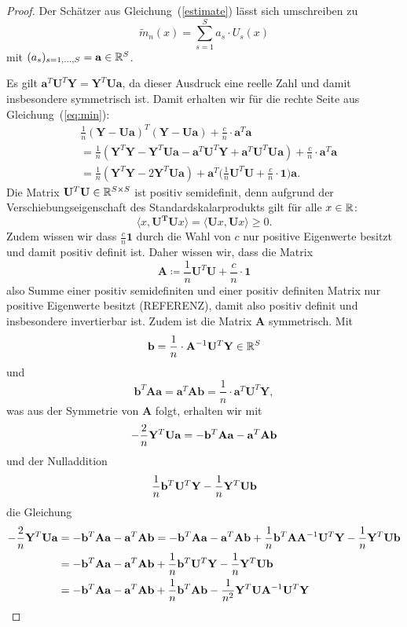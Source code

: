 \begin{proof}
Der Schätzer aus Gleichung~(\ref{estimate}) lässt sich umschreiben zu 
\begin{equation}
\label{umschreiben}
\tilde{m}_n(x) = \sum_{s = 1}^S a_s \cdot U_s(x)
\end{equation}
mit $(a_s)_{s = 1,\dots,S} = \mathbf{a}\in \mathbb{R}^S$. 

Es gilt $\mathbf{a}^T\mathbf{U}^T\mathbf{Y} = \mathbf{Y}^T\mathbf{U}\mathbf{a}$, da dieser Ausdruck eine reelle Zahl und damit insbesondere symmetrisch ist. Damit erhalten wir für die rechte Seite aus Gleichung~(\ref{eq:min}):
\begin{equation}
\label{eq:matrix}
\begin{split}
& \frac{1}{n}(\mathbf{Y} - \mathbf{U}\mathbf{a})^T(\mathbf{Y} - \mathbf{U}\mathbf{a}) + \frac{c}{n} \cdot \mathbf{a}^T\mathbf{a} \\
& = \frac{1}{n}(\mathbf{Y}^T\mathbf{Y} - \mathbf{Y}^T\mathbf{U}\mathbf{a} - \mathbf{a}^T\mathbf{U}^T\mathbf{Y} + \mathbf{a}^T\mathbf{U}^T\mathbf{U}\mathbf{a}) + \frac{c}{n} \cdot \mathbf{a}^T\mathbf{a} \\
& = \frac{1}{n}(\mathbf{Y}^T\mathbf{Y} - 2\mathbf{Y}^T\mathbf{U}\mathbf{a}) + \mathbf{a}^T\bigg(\frac{1}{n} \mathbf{U}^T\mathbf{U} + \frac{c}{n} \cdot \mathbf{1}\bigg) \mathbf{a}.
\end{split}
\end{equation} 
Die Matrix $\mathbf{U}^T\mathbf{U} \in \mathbb{R}^{S \times S}$ ist positiv semidefinit, denn aufgrund der Verschiebungseigenschaft des Standardskalarprodukts gilt für alle $x \in \mathbb{R}$:
$$\langle x, \mathbf{U^T}\mathbf{U} x\rangle = \langle \mathbf{U} x, \mathbf{U} x\rangle \geq 0.$$
Zudem wissen wir dass $\frac{c}{n}\mathbf{1}$ durch die Wahl von $c$ nur positive Eigenwerte besitzt und damit positiv definit ist.  
Daher wissen wir, dass die Matrix
$$\mathbf{A} \coloneqq \frac{1}{n}\mathbf{U}^T\mathbf{U} + \frac{c}{n} \cdot \mathbf{1}$$ also Summe einer positiv semidefiniten und einer positiv definiten Matrix nur positive Eigenwerte besitzt (REFERENZ), damit also positiv definit und insbesondere invertierbar ist. Zudem ist die Matrix $\mathbf{A}$ symmetrisch. 
Mit $$\mathbf{b} = \frac{1}{n} \cdot \mathbf{A}^{-1}\mathbf{U}^T\mathbf{Y} \in \mathbb{R}^S$$ und $$\mathbf{b}^T\mathbf{A}\mathbf{a} = \mathbf{a}^T\mathbf{A}\mathbf{b} = \frac{1}{n} \cdot \mathbf{a}^T\mathbf{U}^T\mathbf{Y},$$ was aus der Symmetrie von $\mathbf{A}$ folgt, erhalten wir mit 
$$ - \frac{2}{n}\mathbf{Y}^T\mathbf{U}\mathbf{a} = - \mathbf{b}^T\mathbf{A}\mathbf{a} - \mathbf{a}^T\mathbf{A}\mathbf{b} $$
und der Nulladdition $$\frac{1}{n}\mathbf{b}^T\mathbf{U}^T\mathbf{Y} - \frac{1}{n}\mathbf{Y}^T\mathbf{U}\mathbf{b}$$
die Gleichung 
\begin{equation}
\begin{split}
- \frac{2}{n}\mathbf{Y}^T\mathbf{U}\mathbf{a} & = - \mathbf{b}^T\mathbf{A}\mathbf{a} - \mathbf{a}^T\mathbf{A}\mathbf{b} =  - \mathbf{b}^T\mathbf{A}\mathbf{a} - \mathbf{a}^T\mathbf{A}\mathbf{b} + \frac{1}{n}\mathbf{b}^T\mathbf{A}\mathbf{A}^{-1}\mathbf{U}^T\mathbf{Y} - \frac{1}{n}\mathbf{Y}^T\mathbf{U}\mathbf{b} \\
 & = - \mathbf{b}^T\mathbf{A}\mathbf{a} - \mathbf{a}^T\mathbf{A}\mathbf{b} + \frac{1}{n}\mathbf{b}^T\mathbf{U}^T\mathbf{Y} - \frac{1}{n}\mathbf{Y}^T\mathbf{U}\mathbf{b} \\
& = - \mathbf{b}^T\mathbf{A}\mathbf{a} - \mathbf{a}^T\mathbf{A}\mathbf{b} + \frac{1}{n}\mathbf{b}^T\mathbf{A}\mathbf{b} - \frac{1}{n^2}\mathbf{Y}^T\mathbf{U}\mathbf{A}^{-1}\mathbf{U}^T\mathbf{Y}
\end{split}
\end{equation}


\end{proof}
